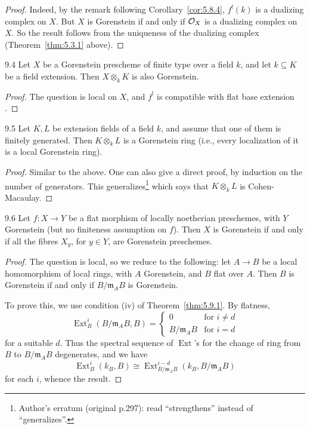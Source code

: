 \begin{proof}
Indeed, by the remark following Corollary~\ref{cor:5.8.4}, $f^{!}(k)$ is a dualizing complex on $X$. But $X$ is Gorenstein if and only if $\mathcal{O}_X$ is a dualizing complex on $X$. So the result follows from the uniqueness of the dualizing complex (Theorem~\ref{thm:5.3.1} above).
\end{proof}

\begin{bookcorollary}{9.4}\label{cor:5.9.4}
Let $X$ be a Gorenstein prescheme of finite type over a field $k$, and let $k\subseteq K$ be a field extension. Then $X\otimes_k K$ is also Gorenstein.
\end{bookcorollary}

\begin{proof}
The question is local on $X$, and $f^{!}$ is compatible with flat base extension .
\end{proof}

\begin{bookcorollary}{9.5}\label{cor:5.9.5}
Let $K,L$ be extension fields of a field $k$, and assume that one of them is finitely generated. Then $K\otimes_k L$ is a Gorenstein ring (i.e., every localization of it is a local Gorenstein ring).
\end{bookcorollary}

\begin{proof}
Similar to the above. One can also give a direct proof, by induction on the number of generators. This generalizes\footnote{Author's erratum (original p.297): read ``strengthens'' instead of ``generalizes''.} \cite[\nopp IV,~6.7.1.1]{EGA} which says that $K\otimes_k L$ is Cohen-Macaulay.
\end{proof}

\begin{bookproposition}{9.6}\label{prop:5.9.6}
Let $f\colon X\to Y$ be a flat morphism of locally noetherian preschemes, with $Y$ Gorenstein (but no finiteness assumption on $f$). Then $X$ is Gorenstein if and only if all the fibres $X_{y}$, for $y\in Y$, are Gorenstein preschemes.
\end{bookproposition}

\begin{proof}
The question is local, so we reduce to the following: let $A\to B$ be a local homomorphism of local rings, with $A$ Gorenstein, and $B$ flat over $A$. Then $B$ is Gorenstein if and only if $B/\mathfrak{m}_A B$ is Gorenstein.

To prove this, we use condition (iv) of Theorem~\ref{thm:5.9.1}. By flatness,
\[
\operatorname{Ext}_{B}^{i}(B/\mathfrak{m}_A B, B) = \begin{cases} 0 & \text{for } i\neq d \\ B/\mathfrak{m}_A B & \text{for } i = d \end{cases}
\]
for a suitable $d$. Thus the spectral sequence of $\operatorname{Ext}$'s for the change of ring from $B$ to $B/\mathfrak{m}_A B$ degenerates, and we have
\[
\operatorname{Ext}_{B}^{i}(k_B, B) \cong \operatorname{Ext}_{B/\mathfrak{m}_A B}^{i-d}(k_B, B/\mathfrak{m}_A B)
\]
for each $i$, whence the result.
\end{proof}

